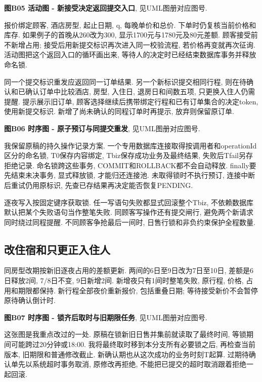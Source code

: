 \documentclass[cn,nofont,11pt,a4paper]{elegantpaper}
\begin{document}
\textbf{图B05 活动图 - 新接受决定返回提交入口}, 见UML图册对应图号.

报价绑定顾客, 酒店房型, 起止日期, q, 每晚单价和总价. 下单时仍复核当前价格和库存. 如果例子的首晚从260改为300, 显示1700元与1780元及80元差额. 顾客接受前不新增占用; 接受后用新提交标识再次进入同一校验流程, 若价格再变就再次征询. 活动图把这个返回入口的循环画出来, 等待人的决定时已经结束数据库事务并释放命名锁.

同一个提交标识重发应返回同一订单结果. 另一个新标识提交相同行程, 则在待确认和已确认订单中比较酒店, 房型, 入住日, 退房日和间数五项, 只更换入住人仍需提醒. 提示展示旧订单, 顾客选择继续后携带绑定行程和已有订单集合的决定token, 使用新提交标识. 新增了尚未确认的同程订单时再提示, 放弃则保留原订单.

\textbf{图B06 时序图 - 原子预订与同提交重发}, 见UML图册对应图号.

我保留原稿的持久操作记录方案. 一个专用数据库连接取得按调用者和operationId区分的命名锁, T0保存内容绑定, Tbiz保存成功业务及最终结果, 失败后Tfail另存拒绝记录. 命名锁跨这些事务, COMMIT和ROLLBACK都不会自动释放. finally要先结束未决事务, 显式释放锁, 才能归还连接池. 未取得锁时不执行预订, 连接中断后重试仍用原标识, 先查已存结果再决定能否恢复PENDING.

逐夜写入按固定键序获取锁. 任一写语句失败都显式回滚整个Tbiz, 不依赖数据库默认把某个失败语句当作整笔失败. 同顾客写操作还有提交闸行, 避免两个新请求同时绕过同程提醒. 不同顾客争抢最后一间时, 日售行锁和非负约束保护全程数量.

\hypertarget{ux6539ux4f4fux5bbfux548cux53eaux66f4ux6b63ux5165ux4f4fux4eba}{%
\subsection{改住宿和只更正入住人}\label{ux6539ux4f4fux5bbfux548cux53eaux66f4ux6b63ux5165ux4f4fux4eba}}

同房型改期按新旧逐夜占用的差额更新. 两间的6日至9日改为7日至10日, 差额是6日释放2间, 7/8日不变, 9日新增2间. 新增夜只有1间时整笔失败, 原行程, 价格, 占用和期限都保持. 新行程全部夜价重新报价, 包括重叠日期; 等待接受新价不会暂停原待确认倒计时.

\textbf{图B07 时序图 - 锁齐后取时与旧期限任务}, 见UML图册对应图号.

这张图是我重点改过的一处. 原稿在锁新旧日售并集前就读取了最终时间, 等锁期间可能跨过20分钟或18:00. 我将最终取时移到本分支所有必要锁之后, 再检查当前版本, 旧期限和普通修改截止. 新确认期也从这次成功的业务时刻T起算. 过期待确认单先以系统超时事务取消, 原修改再拒绝, 不能把已提交的超时取消跟着拒绝一起回滚.
\end{document}
